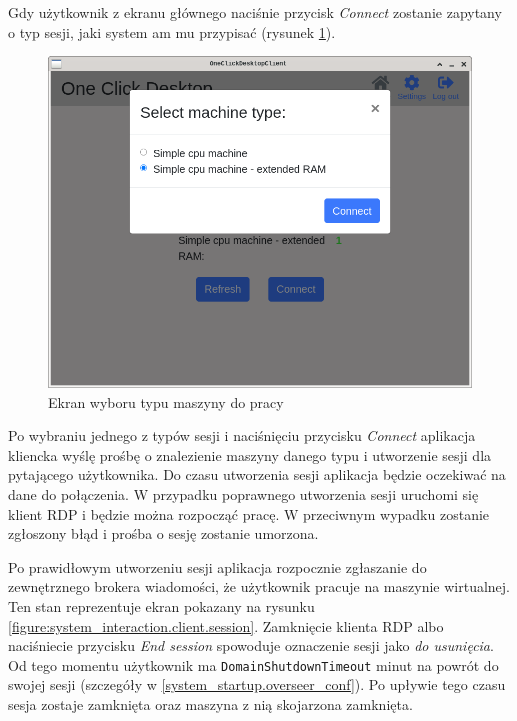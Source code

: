\documentclass[../opis-rozwiazania.tex]{subfiles}
\begin{document}
Gdy użytkownik z ekranu głównego naciśnie przycisk \textit{Connect} zostanie zapytany o typ sesji, jaki system am mu przypisać (rysunek \ref{figure:system_interaction.client.select}).

\begin{figure}[H]
	\centering
	\includegraphics[width=\textwidth]{resources/client_select.png}
	\caption{Ekran wyboru typu maszyny do pracy}
	\label{figure:system_interaction.client.select}
\end{figure}

Po wybraniu jednego z typów sesji i naciśnięciu przycisku \textit{Connect} aplikacja kliencka wyślę prośbę o znalezienie maszyny danego typu i utworzenie sesji dla pytającego użytkownika.
Do czasu utworzenia sesji aplikacja będzie oczekiwać na dane do połączenia.
W przypadku poprawnego utworzenia sesji uruchomi się klient RDP i będzie można rozpocząć pracę.
W przeciwnym wypadku zostanie zgłoszony błąd i prośba o sesję zostanie umorzona.

Po prawidłowym utworzeniu sesji aplikacja rozpocznie zgłaszanie do zewnętrznego brokera wiadomości, że użytkownik pracuje na maszynie wirtualnej.
Ten stan reprezentuje ekran pokazany na rysunku \ref{figure:system_interaction.client.session}.
Zamknięcie klienta RDP albo naciśniecie przycisku \textit{End session} spowoduje oznaczenie sesji jako \textit{do usunięcia}.
Od tego momentu użytkownik ma \texttt{DomainShutdownTimeout} minut na powrót do swojej sesji (szczegóły w \ref{system_startup.overseer_conf}).
Po upływie tego czasu sesja zostaje zamknięta oraz maszyna z nią skojarzona zamknięta.
\end{document}

